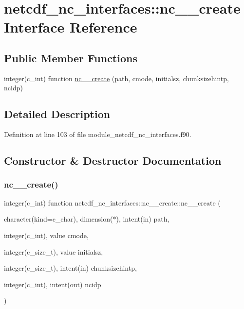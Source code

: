 \hypertarget{interfacenetcdf__nc__interfaces_1_1nc____create}{}\section{netcdf\+\_\+nc\+\_\+interfaces\+:\+:nc\+\_\+\+\_\+create Interface Reference}
\label{interfacenetcdf__nc__interfaces_1_1nc____create}
\subsection*{Public Member Functions}
\begin{DoxyCompactItemize}
\item 
integer(c\+\_\+int) function \hyperlink{interfacenetcdf__nc__interfaces_1_1nc____create_a6fc89f75f0fd9c91f81f50d1f19e69f5}{nc\+\_\+\+\_\+create} (path, cmode, initialsz, chunksizehintp, ncidp)
\end{DoxyCompactItemize}


\subsection{Detailed Description}


Definition at line 103 of file module\+\_\+netcdf\+\_\+nc\+\_\+interfaces.\+f90.



\subsection{Constructor \& Destructor Documentation}
\mbox{\label{interfacenetcdf__nc__interfaces_1_1nc____create_a6fc89f75f0fd9c91f81f50d1f19e69f5}} 
\subsubsection{\texorpdfstring{nc\+\_\+\+\_\+create()}{nc\_\_create()}}
{\footnotesize\ttfamily integer(c\+\_\+int) function netcdf\+\_\+nc\+\_\+interfaces\+::nc\+\_\+\+\_\+create\+::nc\+\_\+\+\_\+create (\begin{DoxyParamCaption}\item[{character(kind=c\+\_\+char), dimension($\ast$), intent(in)}]{path,  }\item[{integer(c\+\_\+int), value}]{cmode,  }\item[{integer(c\+\_\+size\+\_\+t), value}]{initialsz,  }\item[{integer(c\+\_\+size\+\_\+t), intent(in)}]{chunksizehintp,  }\item[{integer(c\+\_\+int), intent(out)}]{ncidp }\end{DoxyParamCaption})}



